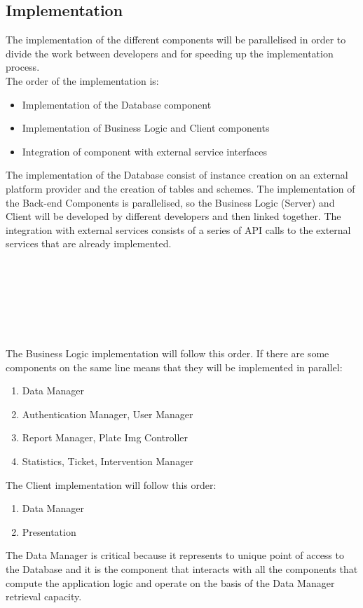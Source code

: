 \documentclass{article}
\begin{document}
	\subsection{Implementation}
	The implementation of the different components will be parallelised in order to divide the work between developers and for speeding up the implementation process. \\
	The order of the implementation is:
	\begin{itemize}
		\item Implementation of the Database component
		\item Implementation of Business Logic and Client components
		\item Integration of component with external service interfaces 
	\end{itemize}
	The implementation of the Database consist of instance creation on an external  platform provider and the creation of tables and schemes. 
	The implementation of the Back-end Components is parallelised, so the Business Logic (Server) and Client will be developed by different developers and then linked together. 
	The integration with external services consists of a series of API calls to the external services that are already implemented. \\ \\ \\ \\ \\ \\ \\ \\
	The Business Logic implementation will follow this order. If there are some components on the same line means that they will be implemented in parallel:
	\begin{enumerate}
		\item Data Manager
		\item Authentication Manager, User Manager
		\item Report Manager, Plate Img Controller
		\item Statistics, Ticket, Intervention Manager
	\end{enumerate}
	The Client implementation will follow this order:
	\begin{enumerate}
		\item Data Manager
		\item Presentation
	\end{enumerate}
	The Data Manager is critical because it represents to unique point of access to the Database and it is the component that interacts with all the components that compute the application logic and operate on the basis of the Data Manager retrieval capacity.
\end{document}
